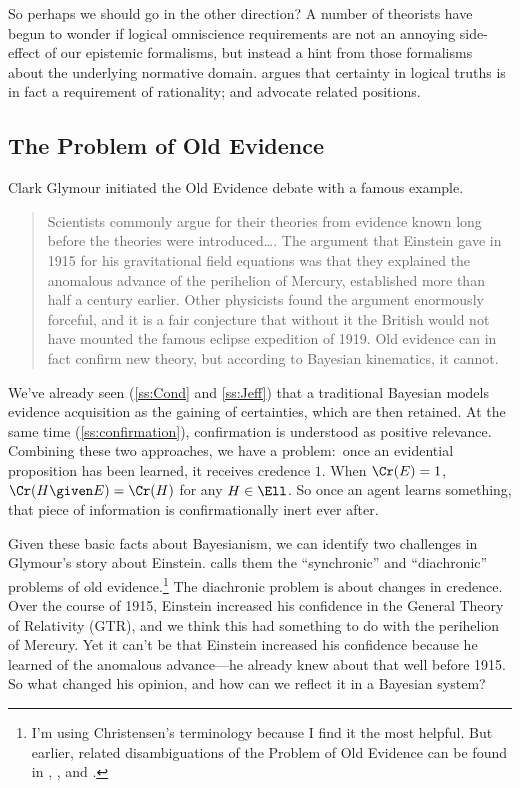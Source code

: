 So perhaps we should go in the other direction? A number of theorists have begun to wonder if logical omniscience requirements are not an annoying side-effect of our epistemic formalisms, but instead a hint from those formalisms about the underlying normative domain. \citet{SmithiesIdeal} argues that certainty in logical truths is in fact a requirement of rationality; \citet{TitelbaumRight} and \citet{LittlejohnSense} advocate related positions.


\subsection{The Problem of Old Evidence}
Clark Glymour initiated the Old Evidence debate with a famous example.
\begin{quote}
Scientists commonly argue for their theories from evidence known long before the theories were introduced\ldots. The argument that Einstein gave in 1915 for his gravitational field equations was that they explained the anomalous advance of the perihelion of Mercury, established more than half a century earlier. Other physicists found the argument enormously forceful, and it is a fair conjecture that without it the British would not have mounted the famous eclipse expedition of 1919. Old evidence can in fact confirm new theory, but according to Bayesian kinematics, it cannot. \citep[pp.\ 306--7]{GlymourTheory}
\end{quote}
We've already seen (\autoref{ss:Cond} and \autoref{ss:Jeff}) that a traditional Bayesian models evidence acquisition as the gaining of certainties, which are then retained. At the same time (\autoref{ss:confirmation}), confirmation is understood as positive relevance. Combining these two approaches, we have a problem:\ once an evidential proposition has been learned, it receives credence $1$. When $\Cr(E)=1$, $\Cr(H \given E)=\Cr(H)$ for any $H \in \Ell$. So once an agent learns something, that piece of information is confirmationally inert ever after.

Given these basic facts about Bayesianism, we can identify two challenges in Glymour's story about Einstein. \citet{ChristensenMeasuring} calls them the ``synchronic'' and ``diachronic'' problems of old evidence.\footnote
{I'm using Christensen's terminology because I find it the most helpful. But earlier, related disambiguations of the Problem of Old Evidence can be found in \citet{Garber}, \citet{EellsOldEvidence}, and \citet{ZyndaOld}.}
The diachronic problem is about changes in credence. Over the course of 1915, Einstein increased his confidence in the General Theory of Relativity (GTR), and we think this had something to do with the perihelion of Mercury. Yet it can't be that Einstein increased his confidence because he learned of the anomalous advance---he already knew about that well before 1915. So what changed his opinion, and how can we reflect it in a Bayesian system?

